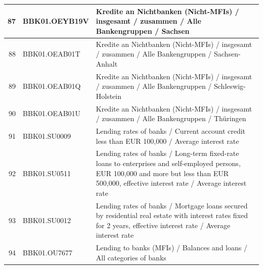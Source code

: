 \documentclass[11pt]{article}
\begin{document}
\begin{table}
\begin{tabular}{rp{5cm}p{11cm}}
  \hline
  87 & BBK01.OEYB19V & Kredite an Nichtbanken (Nicht-MFIs) / insgesamt / zusammen / Alle Bankengruppen / Sachsen \\ 
  \hline
  88 & BBK01.OEAB01T & Kredite an Nichtbanken (Nicht-MFIs) / insgesamt / zusammen / Alle Bankengruppen / Sachsen-Anhalt \\ 
  \hline
  89 & BBK01.OEAB01Q & Kredite an Nichtbanken (Nicht-MFIs) / insgesamt / zusammen / Alle Bankengruppen / Schleswig-Holstein \\ 
  \hline
  90 & BBK01.OEAB01U & Kredite an Nichtbanken (Nicht-MFIs) / insgesamt / zusammen / Alle Bankengruppen / Thüringen \\ 
  \hline
  91 & BBK01.SU0009 & Lending rates of banks / Current account credit less than EUR 100,000 / Average interest rate \\ 
  \hline
  92 & BBK01.SU0511 & Lending rates of banks / Long-term fixed-rate loans to enterprises and self-employed persons, EUR 100,000 and more but less than EUR 500,000, effective interest rate / Average interest rate \\ 
  \hline
  93 & BBK01.SU0012 & Lending rates of banks / Mortgage loans secured by residential real estate with interest rates fixed for 2 years, effective interest rate / Average interest rate \\ 
  \hline
  94 & BBK01.OU7677 & Lending to banks (MFIs) / Balances and loans / All categories of banks \\ 
\end{tabular}
\end{table}
\end{document}
